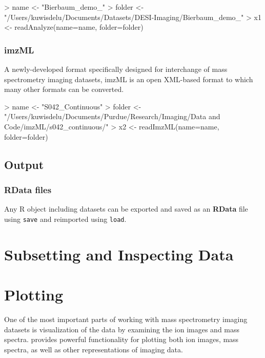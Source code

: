 \documentclass[a4paper]{article}
\begin{document}
\begin{Schunk}
\begin{Sinput}
> name <- "Bierbaum_demo_"
> folder <- "/Users/kuwisdelu/Documents/Datasets/DESI-Imaging/Bierbaum_demo_"
> x1 <- readAnalyze(name=name, folder=folder)
\end{Sinput}
\end{Schunk}

\subsubsection{imzML}

A newly-developed format specifically designed for interchange of mass spectrometry imaging datasets, imzML is an open XML-based format to which many other formats can be converted.

\begin{Schunk}
\begin{Sinput}
> name <- "S042_Continuous"
> folder <- "/Users/kuwisdelu/Documents/Purdue/Research/Imaging/Data and Code/imzML/s042_continuous/"
> x2 <- readImzML(name=name, folder=folder)
\end{Sinput}
\end{Schunk}

\subsection{Output}

\subsubsection{RData files}

Any R object including  datasets can be exported and saved as an \textbf{RData} file using \verb|save| and reimported using \verb|load|.


\section{Subsetting and Inspecting Data}





\section{Plotting}
One of the most important parts of working with mass spectrometry imaging datasets is visualization of the data by examining the ion images and mass spectra.  provides powerful functionality for plotting both ion images, mass spectra, as well as other representations of imaging data.
\end{document}
